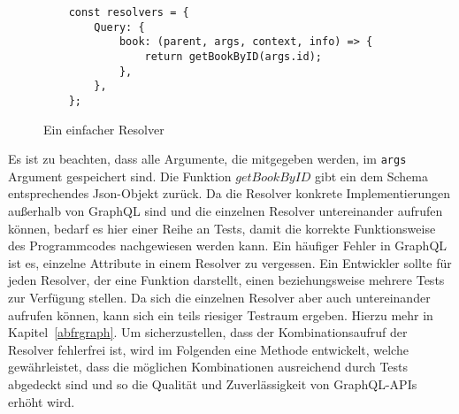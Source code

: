 \begin{figure}[htb]
    \begin{verbatim}
    const resolvers = {
        Query: {
            book: (parent, args, context, info) => {
                return getBookByID(args.id);
            },
        },
    };
    \end{verbatim}
    \caption{Ein einfacher Resolver}
    \label{simpleresolver}
\end{figure}

Es ist zu beachten, dass alle Argumente, die mitgegeben werden, im \verb+args+ Argument gespeichert sind.
Die Funktion $getBookByID$ gibt ein dem Schema entsprechendes Json-Objekt zurück.
Da die Resolver konkrete Implementierungen außerhalb von GraphQL sind und die einzelnen Resolver untereinander aufrufen können, bedarf es hier
einer Reihe an Tests, damit die korrekte Funktionsweise des Programmcodes nachgewiesen werden kann.
Ein häufiger Fehler in GraphQL ist es, einzelne Attribute in einem Resolver zu vergessen.
Ein Entwickler sollte für jeden Resolver, der eine Funktion darstellt, einen beziehungsweise mehrere Tests zur Verfügung stellen.
Da sich die einzelnen Resolver aber auch untereinander aufrufen können, kann sich ein teils riesiger Testraum ergeben.
Hierzu mehr in Kapitel~\ref{abfrgraph}.
Um sicherzustellen, dass der Kombinationsaufruf der Resolver fehlerfrei ist, wird im Folgenden eine Methode entwickelt, welche gewährleistet,
dass die möglichen Kombinationen ausreichend durch Tests abgedeckt sind und so die Qualität und Zuverlässigkeit von GraphQL-APIs erhöht wird.
